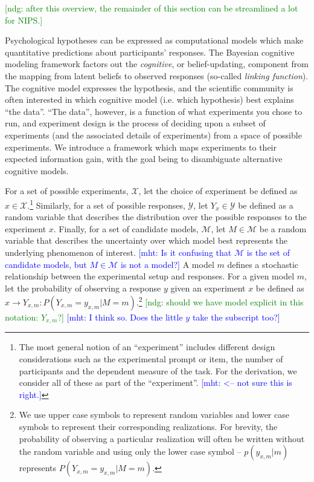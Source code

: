 \documentclass{article}
\newcommand{\ndg}[1]{\textcolor{Green}{[ndg: #1]}}
\newcommand{\mht}[1]{\textcolor{Blue}{[mht: #1]}}
\begin{document}
\ndg{after this overview, the remainder of this section can be streamlined a lot for NIPS.}

Psychological hypotheses can be expressed as computational models which make quantitative predictions about participants' responses. 
The Bayesian cognitive modeling framework factors out the \emph{cognitive}, or belief-updating, component from the mapping from latent beliefs to observed responses (so-called \emph{linking function}).
The cognitive model expresses the hypothesis, and the scientific community is often interested in which cognitive model (i.e. which hypothesis) best explains ``the data''.
``The data'', however, is a function of what experiments you chose to run, and experiment design is the process of deciding upon a subset of experiments (and the associated details of experiments) from a space of possible experiments. 
We introduce a framework which maps experiments to their expected information gain, with the goal being to disambiguate alternative cognitive models. 

For a set of possible experiments, $\mathcal{X}$, let the choice of experiment be defined as $x \in \mathcal{X}$.\footnote{
The most general notion of an ``experiment'' includes different design considerations such as the experimental prompt or item, the number of participants and the dependent measure of the task.  For the derivation, we consider all of these as part of the ``experiment''. \mht{<-- not sure this is right.}
} 
Similarly, for a set of possible responses, $\mathcal{Y}$, let $Y_x \in \mathcal{Y}$ be defined as a random variable that describes the distribution over the possible responses to the experiment $x$. 
Finally, for a set of candidate models, $\mathcal{M}$, let $M \in \mathcal{M}$ be a random variable that describes the uncertainty over which model best represents the underlying phenomenon of interest. 
\mht{ Is it confusing that  $\mathcal{M}$ is the set of candidate models, but $M \in \mathcal{M}$ is not a model?}
A model $m$ defines a stochastic relationship between the experimental setup and responses.
For a given model $m$, let the probability of observing a response $y$ given an experiment $x$ be defined as $x \rightarrow Y_{x,m}: P(Y_{x,m} = y_{x,m} | M = m)$.\footnote{
We use upper case symbols to represent random variables and lower case symbols to represent their corresponding realizations. For brevity, the probability of observing a particular realization will often be written without the random variable and using only the lower case symbol -- $p(y_{x,m} |m)$ represents $P(Y_{x,m} = y_{x,m} | M = m)$.
}
\ndg{should we have model explicit in this notation: $Y_{x,m}$?} \mht{I think so. Does the little $y$ take the subscript too?}
\end{document}
